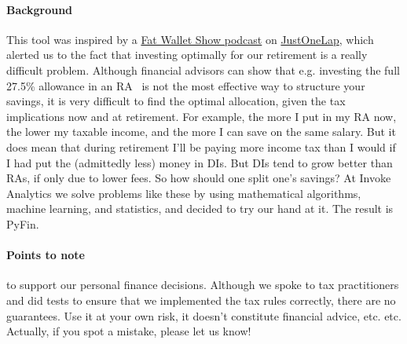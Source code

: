 \documentclass[a4paper, justified]{tufte-handout}
\begin{document}
\paragraph{Background} This tool was inspired by a \href{https://justonelap.com/podcast-can-one-etf-rule/}{Fat Wallet Show podcast} on \href{http://justonelap.com}{JustOneLap}, which alerted us to the fact that investing optimally for our retirement is a really difficult problem. Although financial advisors can show that e.g. investing the full 27.5\% allowance in an RA~ is not the most effective way to structure your savings, it is very difficult to find the optimal allocation, given the tax implications now and at retirement. For example, the more I put in my RA now, the lower my taxable income, and the more I can save on the same salary. But it does mean that during retirement I'll be paying more income tax than I would if I had put the (admittedly less) money in DIs. But DIs tend to grow better than RAs, if only due to lower fees. So how should one split one's savings?  At Invoke Analytics we solve problems like these by using mathematical algorithms, machine learning, and statistics, and decided to try our hand at it. The result is PyFin.

\paragraph{Points to note}  to support our personal finance decisions. Although we spoke to tax practitioners and did tests to ensure that we implemented the tax rules correctly, there are no guarantees. Use it at your own risk, it doesn't constitute financial advice, etc. etc. Actually, if you spot a mistake, please let us know!
\end{document}

